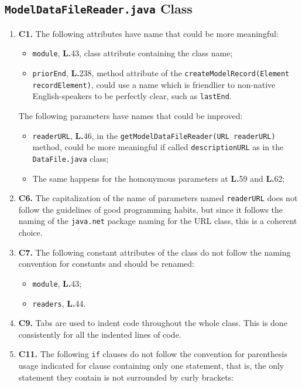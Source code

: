 \subsection{\texttt{ModelDataFileReader.java} Class}
\begin{enumerate}
\item \textbf{C1.} The following attributes have name that could be more meaningful:
	\begin{itemize}
	\item \texttt{module}, \textbf{L.}43, class attribute containing the class name;
	\item \texttt{priorEnd}, \textbf{L.}238, method attribute of the \texttt{createModelRecord(Element recordElement)}, could use a name which is friendlier to non-native English-speakers to be perfectly clear, such as \texttt{lastEnd}.
	\end{itemize}	
The following parameters have names that could be improved:
	\begin{itemize}
	\item \texttt{readerURL}, \textbf{L.}46, in the \texttt{getModelDataFileReader(URL readerURL)} method, could be more meaningful if called \texttt{descriptionURL} as in the \texttt{DataFile.java} class;
	\item The same happens for the homonymous parameters at \textbf{L.}59 and \textbf{L.}62;
	\end{itemize}
\item \textbf{C6.} The capitalization of the name of parameters named \texttt{readerURL} does not follow the guidelines of good programming habits, but since it follows the naming of the \texttt{java.net} package naming for the URL class, this is a coherent choice.
\item \textbf{C7.} The following constant attributes of the class do not follow the naming convention for constants and should be renamed:
	\begin{itemize}
	\item \texttt{module}, \textbf{L.}43;
	\item \texttt{readers}, \textbf{L.}44.
	\end{itemize}
\item \textbf{C9.} Tabs are used to indent code throughout the whole class. This is done consistently for all the indented lines of code.
\item \textbf{C11.} The following \texttt{if} clauses do not follow the convention for parenthesis usage indicated for clause containing only one statement, that is, the only statement they contain is not surrounded by curly brackets:

\end{enumerate}
